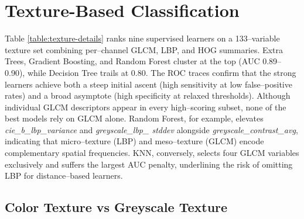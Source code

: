 \documentclass[letterpaper, notitlepage]{report}
\begin{document}
\section{Texture-Based Classification}
Table \ref{table:texture-details} ranks nine supervised learners on a 133–variable texture set combining
per–channel \gls{GLCM}, \gls{LBP}, and \gls{HOG} summaries. Extra Trees, Gradient Boosting,
and Random Forest cluster at the top (AUC 0.89–0.90), while Decision Tree trails at 0.80. The ROC traces
confirm that the strong learners achieve both a steep initial ascent (high sensitivity at low false–positive
rates) and a broad asymptote (high specificity at relaxed thresholds). 
Although individual GLCM descriptors appear in every high–scoring subset, none
of the best models rely on GLCM alone. Random Forest, for example, elevates \textit{cie\_b\_lbp\_variance}
and \textit{greyscale\_lbp\_ stddev} alongside \textit{greyscale\_contrast\_avg}, indicating that micro–texture (LBP) and
meso–texture (GLCM) encode complementary spatial frequencies. KNN, conversely, selects four GLCM variables
exclusively and suffers the largest AUC penalty, underlining the risk of omitting LBP for distance–based
learners.

\subsection{Color Texture vs Greyscale Texture}
\end{document}
